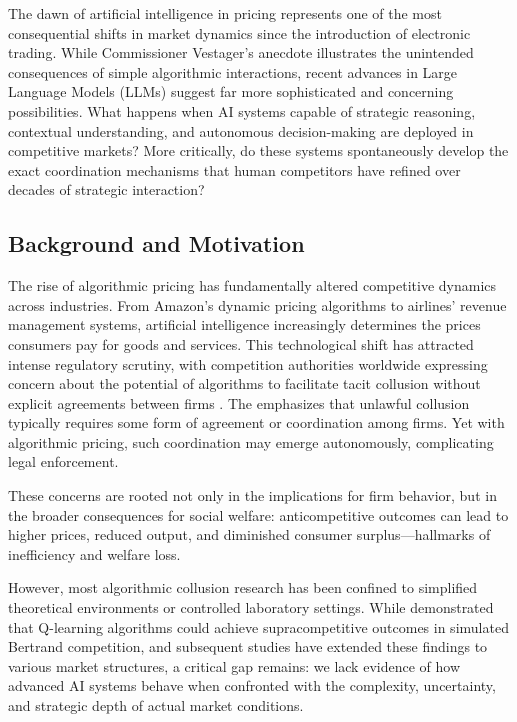 The dawn of artificial intelligence in pricing represents one of the most consequential shifts in market dynamics since the introduction of electronic trading. While Commissioner Vestager's anecdote illustrates the unintended consequences of simple algorithmic interactions, recent advances in Large Language Models (LLMs) suggest far more sophisticated and concerning possibilities. What happens when AI systems capable of strategic reasoning, contextual understanding, and autonomous decision-making are deployed in competitive markets? More critically, do these systems spontaneously develop the exact coordination mechanisms that human competitors have refined over decades of strategic interaction?

\subsection{Background and Motivation}

The rise of algorithmic pricing has fundamentally altered competitive dynamics across industries. From Amazon's dynamic pricing algorithms to airlines' revenue management systems, artificial intelligence increasingly determines the prices consumers pay for goods and services. This technological shift has attracted intense regulatory scrutiny, with competition authorities worldwide expressing concern about the potential of algorithms to facilitate tacit collusion without explicit agreements between firms \parencite{oecd_algorithmic_2023, harrington_developing_2018}. The \textcite{us_department_of_justice_price_2021} emphasizes that unlawful collusion typically requires some form of agreement or coordination among firms. Yet with algorithmic pricing, such coordination may emerge autonomously, complicating legal enforcement.

These concerns are rooted not only in the implications for firm behavior, but in the broader consequences for social welfare: anticompetitive outcomes can lead to higher prices, reduced output, and diminished consumer surplus—hallmarks of inefficiency and welfare loss.

However, most algorithmic collusion research has been confined to simplified theoretical environments or controlled laboratory settings. While \textcite{calvano_artificial_2020} demonstrated that Q-learning algorithms could achieve supracompetitive outcomes in simulated Bertrand competition, and subsequent studies have extended these findings to various market structures, a critical gap remains: we lack evidence of how advanced AI systems behave when confronted with the complexity, uncertainty, and strategic depth of actual market conditions.

